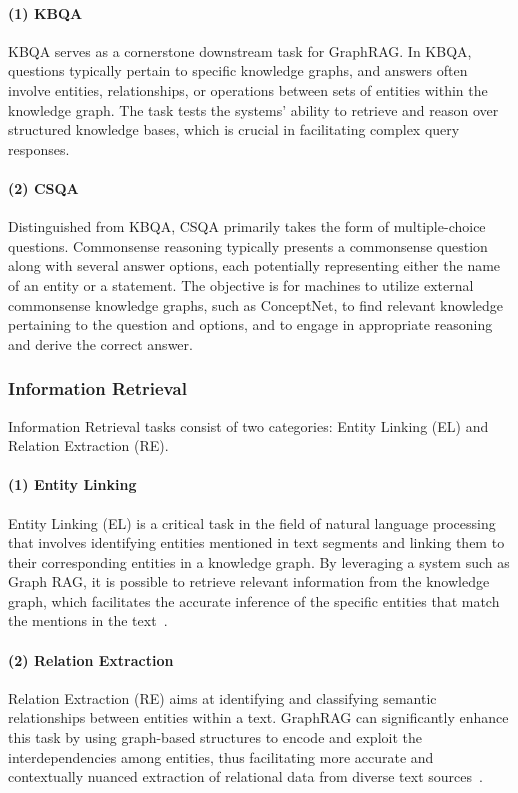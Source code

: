 \documentclass[acmsmall]{acmart}
\begin{document}
\paragraph{(1) KBQA}
KBQA serves as a cornerstone downstream task for GraphRAG. In KBQA, questions typically pertain to specific knowledge graphs, and answers often involve entities, relationships, or operations between sets of entities within the knowledge graph. The task tests the systems' ability to retrieve and reason over structured knowledge bases, which is crucial in facilitating complex query responses. 

\paragraph{(2) CSQA}
Distinguished from KBQA, CSQA primarily takes the form of multiple-choice questions. Commonsense reasoning typically presents a commonsense question along with several answer options, each potentially representing either the name of an entity or a statement. The objective is for machines to utilize external commonsense knowledge graphs, such as ConceptNet, to find relevant knowledge pertaining to the question and options, and to engage in appropriate reasoning and derive the correct answer. 

\subsubsection{Information Retrieval}

Information Retrieval tasks consist of two categories: Entity Linking (EL) and Relation Extraction (RE).

\paragraph{(1) Entity Linking} Entity Linking (EL) is a critical task in the field of natural language processing that involves identifying entities mentioned in text segments and linking them to their corresponding entities in a knowledge graph. By leveraging a system such as Graph RAG, it is possible to retrieve relevant information from the knowledge graph, which facilitates the accurate inference of the specific entities that match the mentions in the text~\cite{ref:ger}.

\paragraph{(2) Relation Extraction} Relation Extraction (RE) aims at identifying and classifying semantic relationships between entities within a text. GraphRAG can significantly enhance this task by using graph-based structures to encode and exploit the interdependencies among entities, thus facilitating more accurate and contextually nuanced extraction of relational data from diverse text sources~\cite{ref:tog,ref:oda,ref:noname6}.
\end{document}
